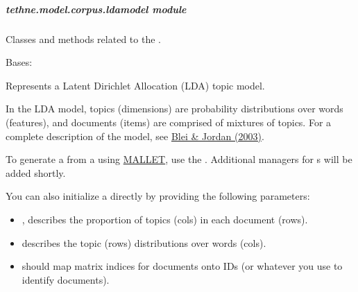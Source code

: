\documentclass[letterpaper,10pt,english]{sphinxmanual}
\begin{document}
\subparagraph{tethne.model.corpus.ldamodel module}
\label{tethne.model.corpus.ldamodel::doc}\label{tethne.model.corpus.ldamodel:module-tethne.model.corpus.ldamodel}\label{tethne.model.corpus.ldamodel:tethne-model-corpus-ldamodel-module}
Classes and methods related to the {\hyperref[tethne.model.corpus.ldamodel:tethne.model.corpus.ldamodel.LDAModel]{}}.

\begin{fulllineitems}
\label{tethne.model.corpus.ldamodel:tethne.model.corpus.ldamodel.LDAModel}
Bases: {\hyperref[tethne.model.basemodel:tethne.model.basemodel.BaseModel]{}}

Represents a Latent Dirichlet Allocation (LDA) topic model.

In the LDA model, topics (dimensions) are probability distributions over 
words (features), and documents (items) are comprised of mixtures of topics.
For a complete description of the model, see 
\href{http://jmlr.org/papers/v3/blei03a.html}{Blei \& Jordan (2003)}.

To generate a {\hyperref[tethne.model.corpus.ldamodel:tethne.model.corpus.ldamodel.LDAModel]{}} from a {\hyperref[tethne.classes.corpus:tethne.classes.corpus.Corpus]{}} using
\href{http://mallet.cs.umass.edu/}{MALLET}, use the 
{\hyperref[tethne.model.managers.mallet:tethne.model.managers.mallet.MALLETModelManager]{}}. Additional managers for {\hyperref[tethne.model.corpus.ldamodel:tethne.model.corpus.ldamodel.LDAModel]{}}s
will be added shortly.

You can also initialize a {\hyperref[tethne.model.corpus.ldamodel:tethne.model.corpus.ldamodel.LDAModel]{}} directly by providing the
following parameters:
\begin{itemize}
\item {} 
, describes the proportion of topics (cols) in each document 
(rows).

\item {} 
 describes the topic (rows) distributions over words (cols).

\item {} 
 should map matrix indices for documents onto {\hyperref[tethne.classes.paper:tethne.classes.paper.Paper]{}}
IDs (or whatever you use to identify documents).


\end{itemize}
\end{fulllineitems}
\end{document}
